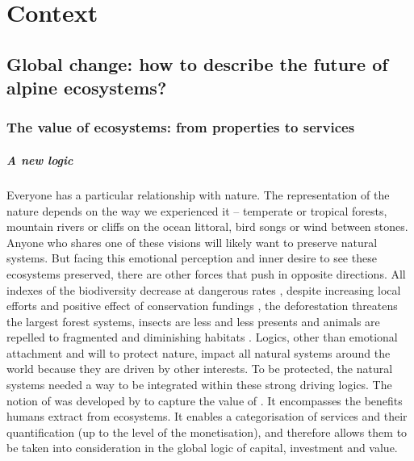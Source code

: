 

\chapter{Context}

\section{Global change: how to describe the future of alpine ecosystems?}

\subsection{The value of ecosystems: from properties to services}

\paragraph{A new logic}
Everyone has a particular relationship with nature. The representation of the nature depends on the way we experienced it -- temperate or tropical forests, mountain rivers or cliffs on the ocean littoral, bird songs or wind between stones. Anyone who shares one of these visions will likely want to preserve natural systems. But facing this emotional perception and inner desire to see these ecosystems preserved, there are other forces that push in opposite directions. All indexes of the biodiversity decrease at dangerous rates \parencite{butchart_global_2010}, despite increasing local efforts and positive effect of conservation fundings \parencite{waldron_reductions_2017}, the deforestation threatens the largest forest systems, insects are less and less presents \parencite{hallmann_more_2017} and animals are repelled to fragmented and diminishing habitats \parencite{tucker_moving_2018}. Logics, other than emotional attachment and will to protect nature, impact all natural systems around the world because they are driven by other interests. To be protected, the natural systems needed a way to be integrated within these strong driving logics. The notion of  was developed by \cite{costanza_value_1997} to capture the value of . It encompasses the benefits humans extract from ecosystems. It enables a categorisation of services and their quantification (up to the level of the monetisation), and therefore allows them to be taken into consideration in the global logic of capital, investment and value.


